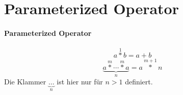 \documentclass{article}
\begin{document}
\section{Parameterized Operator}
\paragraph{Parameterized Operator}
\[ a \operatorname*{\ast}^1 b = a + b \]
\[ \underbrace{a \operatorname*{\ast}^m \dotsb \operatorname*{\ast}^m a}_n = a\operatorname*{\ast}^{m+1}n\]
Die Klammer $\underbrace{\dots}_n$ ist hier nur f\"ur $n > 1$ definiert.
\end{document}

